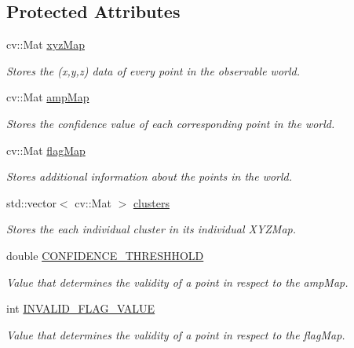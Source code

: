 \subsection*{Protected Attributes}
\begin{DoxyCompactItemize}
\item 
cv\+::\+Mat \hyperlink{class_depth_camera_a10123e69a9879a27a2c5ae434a916a5e}{xyz\+Map}
\begin{DoxyCompactList}\small\item\em Stores the (x,y,z) data of every point in the observable world. \end{DoxyCompactList}\item 
cv\+::\+Mat \hyperlink{class_depth_camera_a067d5cd9eedcdaa95cc440e7381fdb9c}{amp\+Map}
\begin{DoxyCompactList}\small\item\em Stores the confidence value of each corresponding point in the world. \end{DoxyCompactList}\item 
cv\+::\+Mat \hyperlink{class_depth_camera_a5b6e685ea92518f7deeb317ff6d0358f}{flag\+Map}
\begin{DoxyCompactList}\small\item\em Stores additional information about the points in the world. \end{DoxyCompactList}\item 
\hypertarget{class_depth_camera_a333347ab312906b2196596b078fc98b4}{}\label{class_depth_camera_a333347ab312906b2196596b078fc98b4} 
std\+::vector$<$ cv\+::\+Mat $>$ \hyperlink{class_depth_camera_a333347ab312906b2196596b078fc98b4}{clusters}
\begin{DoxyCompactList}\small\item\em Stores the each individual cluster in its individual X\+Y\+Z\+Map. \end{DoxyCompactList}\item 
double \hyperlink{class_depth_camera_a4a2bb91ca2e9be53a53c4a6dcf0e1677}{C\+O\+N\+F\+I\+D\+E\+N\+C\+E\+\_\+\+T\+H\+R\+E\+S\+H\+H\+O\+LD}
\begin{DoxyCompactList}\small\item\em Value that determines the validity of a point in respect to the amp\+Map. \end{DoxyCompactList}\item 
int \hyperlink{class_depth_camera_af7eb5186ae7366de110bb5b08803e11d}{I\+N\+V\+A\+L\+I\+D\+\_\+\+F\+L\+A\+G\+\_\+\+V\+A\+L\+UE}
\begin{DoxyCompactList}\small\item\em Value that determines the validity of a point in respect to the flag\+Map. \end{DoxyCompactList}\item 

\end{DoxyCompactItemize}
